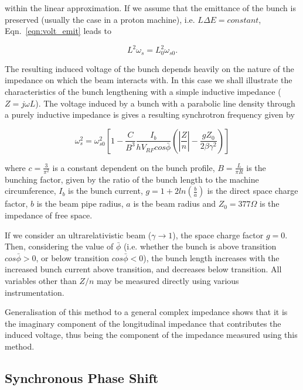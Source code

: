 within the linear approximation. If we assume that the emittance of the bunch is preserved (usually the case in a proton machine), i.e. $L\Delta E = constant$, Eqn.~\ref{eqn:volt_emit} leads to

\begin{equation}
L^{2}\omega_{s} = L_{0}^{2}\omega_{s0}.
\end{equation}

The resulting induced voltage of the bunch depends heavily on the nature of the impedance on which the beam interacts with. In this case we shall illustrate the characteristics of the bunch lengthening with a simple inductive impedance ($Z = j\omega L$). The voltage induced by a bunch with a parabolic line density through a purely inductive impedance is gives a resulting synchrotron frequency given by

\begin{equation}
\omega_{s}^{2} = \omega_{s0}^{2}\left[ 1 - \frac{C}{B^{3}} \frac{I_{b}}{hV_{RF}cos\bar{\phi}} \left( \left| \frac{Z}{n}  \right| - \frac{gZ_{0}}{2\beta\gamma^{2}}   \right)    \right]
\end{equation}

where $c = \frac{3}{\pi^{2}}$ is a constant dependent on the bunch profile, $B = \frac{L}{\pi R}$ is the bunching
factor, given by the ratio of the bunch length to the machine circumference, $I_{b}$ is the bunch current, $g = 1 + 2ln\left(\frac{b}{a} \right)$ is the direct space charge factor, $b$ is the beam pipe radius, $a$ is the beam radius and $Z_{0} = 377\Omega$ is the impedance of free space.

If we consider an ultrarelativistic beam ($\gamma \rightarrow 1$), the space charge factor $g = 0$. Then, considering the value of $\bar{\phi}$ (i.e. whether the bunch is above transition $cos\bar{\phi} > 0$, or below transition $cos\bar{\phi} < 0$), the bunch length increases with the increased bunch current above transition, and decreases below transition. All variables other than $Z/n$ may be measured directly using various instrumentation.

Generalisation of this method to a general complex impedance shows that it is the imaginary component of the longitudinal impedance that contributes the induced voltage, thus being the component of the impedance measured using this method.

\subsection{Synchronous Phase Shift}
\label{sec:syn-phase-shift}

